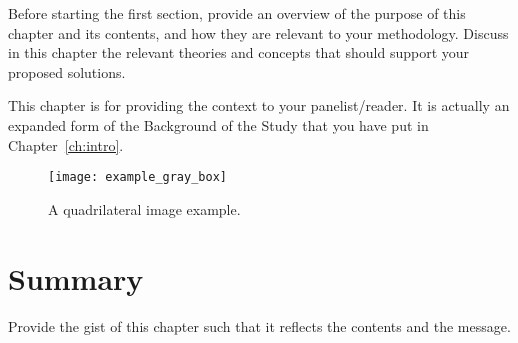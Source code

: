 Before starting the first section, provide an overview of the purpose of this chapter and its contents, and how they are relevant to your methodology.  Discuss in this chapter the relevant theories and concepts that should support your proposed solutions.

This chapter is for providing the context to your panelist/reader.  It is actually an expanded form of the Background of the Study that you have put in Chapter~\ref{ch:intro}.

\graytx{\Blindtext}

\begin{figure}[!htbp]
	\centering
		\texttt{[image: example\_gray\_box]}
	\caption{A quadrilateral image example.}
	\label{fig:exampletc}
\end{figure}

\section{Summary}

Provide the gist of this chapter such that it reflects the contents and the message.